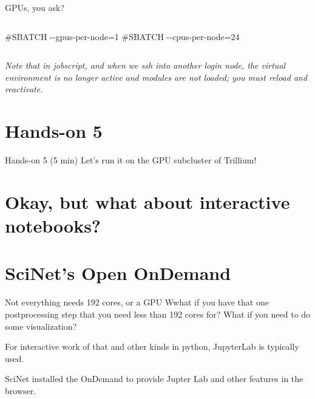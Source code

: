 \documentclass[
  10pt,
  ignorenonframetext,
  aspectratio=169]{beamer}
\newenvironment{Shaded}{\begin{snugshade}}{\end{snugshade}}
\newcommand{\CommentTok}[1]{\textcolor[rgb]{0.50,0.62,0.50}{#1}}
\begin{document}
\begin{frame}[fragile]{GPUs, you ask?}
\begin{columns}[T]
\begin{column}{0.47\linewidth}
\begin{Shaded}
\begin{Highlighting}[]
\CommentTok{\#SBATCH {-}{-}gpus{-}per{-}node=1}
\CommentTok{\#SBATCH {-}{-}cpus{-}per{-}node=24}
\end{Highlighting}
\end{Shaded}
\end{column}
\end{columns}

\pause

\emph{Note that in jobscript, and when we ssh into another login node, the virtual environment is no longer active and modules are not loaded; you must reload and reactivate.}
\end{frame}

\section{Hands-on 5}\label{hands-on-5}

\begin{frame}{Hands-on 5 (5 min)}
\label{hands-on-5-5-min}
Let's run it on the GPU subcluster of Trillium!
\end{frame}

\section{Okay, but what about interactive notebooks?}\label{okay-but-what-about-interactive-notebooks}

\section{SciNet's Open OnDemand}\label{scinets-open-ondemand}

\begin{frame}{Not everything needs 192 cores, or a GPU}
\label{not-everything-needs-192-cores-or-a-gpu}
Wwhat if you have that one postprocessing step that you need less than 192 cores for? \vspace{\baselineskip} What if you need to do some visualization? \vspace{\baselineskip}

\pause

For interactive work of that and other kinds in python, JupyterLab is typically used.

\pause

SciNet installed the OnDemand to provide Jupter Lab and other features in the browser.
\end{frame}
\end{document}
